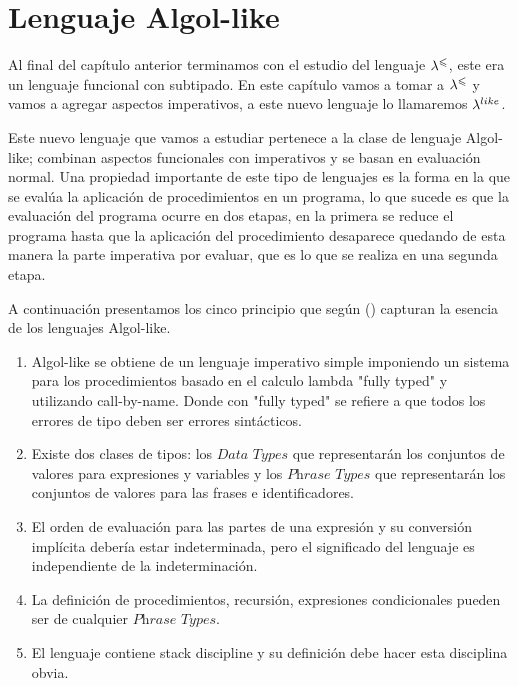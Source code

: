 \chapter{Lenguaje Algol-like}
\label{chap:algollike}

Al final del cap\'itulo anterior terminamos con el estudio
del lenguaje $\lambda^{\leqslant}$, este era un lenguaje funcional con subtipado.
En este cap\'itulo vamos a tomar a $\lambda^{\leqslant}$ y vamos a agregar
aspectos imperativos, a este nuevo lenguaje lo llamaremos $\lambda^{like}$.

Este nuevo lenguaje que vamos a estudiar pertenece a la clase
de lenguaje Algol-like; combinan
aspectos funcionales con imperativos y se basan en evaluaci\'on
normal. Una propiedad importante de este tipo de lenguajes es
la forma en la que se eval\'ua la aplicaci\'on de procedimientos
en un programa, lo que sucede es que la evaluaci\'on del programa
ocurre en dos etapas, en la primera se reduce el programa hasta que
la aplicaci\'on del procedimiento desaparece quedando de esta manera 
la parte imperativa por evaluar, que es lo que se realiza en una segunda
etapa.

A continuaci\'on presentamos los cinco principio que seg\'un (\cite{essenceofalgol})
capturan la esencia de los lenguajes Algol-like.

\begin{enumerate}
\item Algol-like se obtiene de un lenguaje imperativo simple imponiendo un
sistema para los procedimientos basado en el calculo lambda "fully typed" y utilizando
call-by-name. Donde con "fully typed" se refiere a que todos los errores de 
tipo deben ser errores sint\'acticos.

\item Existe dos clases de tipos: los $\textit{Data Types}$ que representar\'an los 
conjuntos de valores para expresiones y variables y los $\textit{Phrase Types}$ que
representar\'an los conjuntos de valores para las frases e identificadores.

\item El orden de evaluaci\'on para las partes de una expresi\'on y su
conversi\'on impl\'icita deber\'ia estar indeterminada, pero el significado
del lenguaje es independiente de la indeterminaci\'on.

\item La definici\'on de procedimientos, recursi\'on, expresiones condicionales
pueden ser de cualquier $\textit{Phrase Types}$.

\item El lenguaje contiene stack discipline y su definici\'on debe hacer esta disciplina
obvia.

\end{enumerate}

